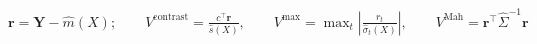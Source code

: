 \documentclass[border=8pt]{standalone}
\begin{document}
$\displaystyle \bm r=\bm Y-\widehat m(X);\qquad V^{\text{contrast}}=\frac{c^{\top}\bm r}{\widehat s(X)},\qquad V^{\max}=\max_t\left|\frac{r_t}{\widehat\sigma_t(X)}\right|,\qquad V^{\text{Mah}}=\bm r^{\top}\widehat\Sigma^{-1}\bm r$
\end{document}
